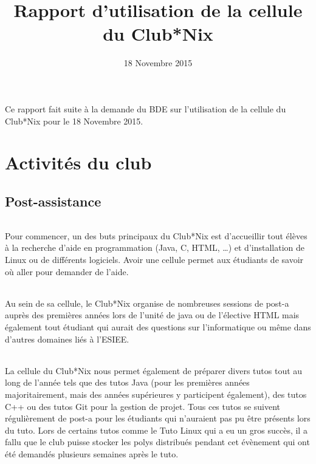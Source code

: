 \documentclass[11pt]{report}
\title{Rapport d'utilisation de la cellule du Club*Nix}
\date{18 Novembre 2015}
\begin{document}
\maketitle

\paragraph{} Ce rapport fait suite à la demande du BDE sur l'utilisation de la
cellule du Club*Nix pour le 18 Novembre 2015.

\tableofcontents

\part{Activités du club}

\chapter{Post-assistance}

\paragraph{} Pour commencer, un des buts principaux du Club*Nix est
d'accueillir tout élèves à la recherche d'aide en programmation (Java, C, HTML,
\ldots) et d'installation de Linux ou de différents logiciels. Avoir une cellule
permet aux étudiants de savoir où aller pour demander de l'aide.

\paragraph{} Au sein de sa cellule, le Club*Nix organise de nombreuses sessions
de post-a auprès des premières années lors de l'unité de java ou de l'élective
HTML mais également tout étudiant qui aurait des questions sur l'informatique
ou même dans d'autres domaines liés à l'ESIEE.  

\paragraph{} La cellule du Club*Nix nous permet également de préparer divers
tutos tout au long de l'année tels que des tutos Java (pour les premières
années majoritairement, mais des années supérieures y participent également),
des tutos C++ ou des tutos Git pour la gestion de projet. Tous ces tutos se
suivent régulièrement de post-a pour les étudiants qui n'auraient pas pu être
présents lors du tuto. Lors de certains tutos comme le Tuto Linux qui a eu un
gros succès, il a fallu que le club puisse stocker les polys distribués pendant
cet évènement qui ont été demandés plusieurs semaines après le tuto.
\end{document}
